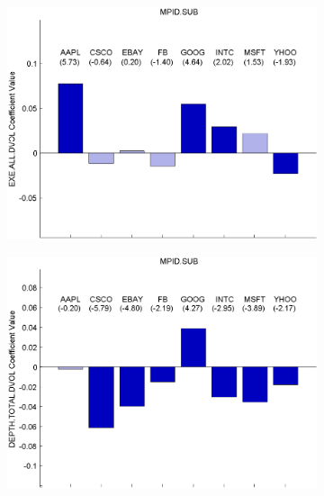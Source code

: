 \documentclass{article}
\begin{document}
\begin{figure}[htp!]
\begin{subfigure}{0.31\textwidth}
\includegraphics[width=\linewidth]{docs/Regression_Ratio_30sec_1_EXE_ALL_DVOL.pdf}
\end{subfigure}
\begin{subfigure}{0.31\textwidth}
\includegraphics[width=\linewidth]{docs/Regression_Ratio_30sec_1_DEPTH_TOTAL_DVOL.pdf}
\end{subfigure}
\begin{subfigure}{0.31\textwidth}

\end{subfigure}
\end{figure}
\end{document}
